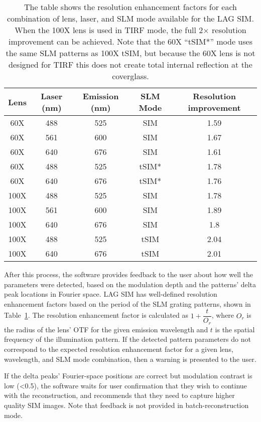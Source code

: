 \begin{table}[h!]
\caption[LAG SIM: Resolution improvement for different lenses, wavelengths, and SLM grating patterns]{\label{tab:resolution}The table shows the resolution enhancement factors for each combination of lens, laser, and SLM mode available for the LAG SIM. When the 100X lens is used in TIRF mode, the full 2$\times$ resolution improvement can be achieved. Note that the 60X ``tSIM*'' mode uses the same SLM patterns as 100X tSIM, but because the 60X lens is not designed for TIRF this does not create total internal reflection at the coverglass. } 
\centering
\begin{tabular}{|c|c|c|c|c|}
\hline
Lens &	Laser (nm) &	Emission (nm) & SLM Mode & Resolution improvement \\ \hline
60X &	488 &	525 &	SIM &	1.59 \\
60X &	561 &	600 &	SIM &	1.67 \\
60X &	640 &	676 &	SIM &	1.61 \\
60X &	488 &	525 &	tSIM* &	1.78 \\
60X &	640 &	676 &	tSIM* &	1.76 \\
100X &	488 &	525 &	SIM &	1.78 \\
100X &	561 &	600 &	SIM &	1.89 \\
100X &	640 &	676 &	SIM &	1.8 \\
100X &	488 &	525 &	tSIM &	2.04 \\
100X &	640 &	676 &	tSIM &	2.01 \\ \hline
\end{tabular}
\end{table}

After this process, the software provides feedback to the user about how well the parameters were detected, based on the modulation depth and the patterns' delta peak locations in Fourier space.
LAG SIM has well-defined resolution enhancement factors based on the period of the SLM grating patterns, shown in Table~\ref{tab:resolution}. 
The resolution enhancement factor is calculated as $1 + \dfrac{t}{O_r}$, where $O_r$ is the radius of the lens' OTF for the given emission wavelength and $t$ is the spatial frequency of the illumination pattern. 
If the detected pattern parameters do not correspond to the expected resolution enhancement factor for a given lens, wavelength, and SLM mode combination, then a warning is presented to the user. 
 
If the delta peaks' Fourier-space positions are correct but modulation contrast is low (<0.5), the software waits for user confirmation that they wish to continue with the reconstruction, and recommends that they need to capture higher quality SIM images. 
Note that feedback is not provided in batch-reconstruction mode. 

